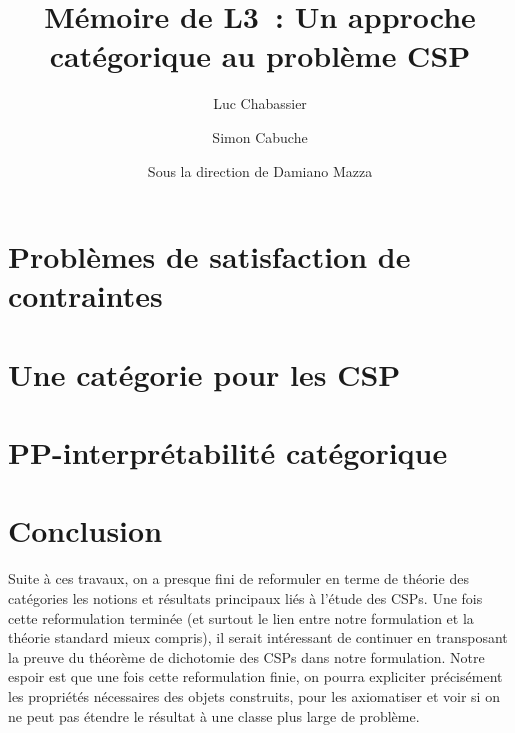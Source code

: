 \documentclass[12pt]{article}
\title{Mémoire de L3~: Un approche catégorique au problème CSP}
\author{Luc Chabassier\and Simon Cabuche}
\date{\small Sous la direction de Damiano Mazza}
\begin{document}
\maketitle

\newpage
\tableofcontents
\newpage


\section{Problèmes de satisfaction de contraintes}\label{secCSP}


\section{Une catégorie pour les CSP}\label{secCat}


\section{PP-interprétabilité catégorique}\label{secPP}


\section{Conclusion}

Suite à ces travaux, on a presque fini de reformuler en terme de théorie des
catégories les notions et résultats principaux liés à l'étude des CSPs. Une
fois cette reformulation terminée (et surtout le lien entre notre formulation
et la théorie standard mieux compris), il serait intéressant de continuer en
transposant la preuve du théorème de dichotomie des CSPs dans notre
formulation. Notre espoir est que une fois cette reformulation finie, on pourra
expliciter précisément les propriétés nécessaires des objets construits, pour
les axiomatiser et voir si on ne peut pas étendre le résultat à une classe plus
large de problème.
\end{document}
